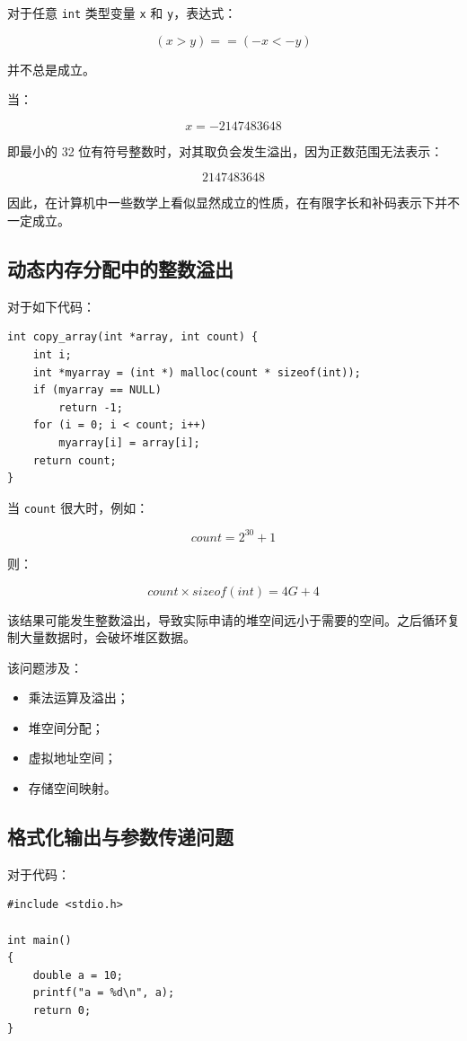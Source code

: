 \documentclass[12pt,a4paper]{ctexart}
\begin{document}
对于任意 \texttt{int} 类型变量 \texttt{x} 和 \texttt{y}，表达式：

\[
(x > y) == (-x < -y)
\]

并不总是成立。

当：

\[
x = -2147483648
\]

即最小的 32 位有符号整数时，对其取负会发生溢出，因为正数范围无法表示：

\[
2147483648
\]

因此，在计算机中一些数学上看似显然成立的性质，在有限字长和补码表示下并不一定成立。

\subsection{动态内存分配中的整数溢出}

对于如下代码：

\begin{verbatim}
int copy_array(int *array, int count) {
    int i;
    int *myarray = (int *) malloc(count * sizeof(int));
    if (myarray == NULL)
        return -1;
    for (i = 0; i < count; i++)
        myarray[i] = array[i];
    return count;
}
\end{verbatim}

当 \texttt{count} 很大时，例如：

\[
count = 2^{30} + 1
\]

则：

\[
count \times sizeof(int) = 4G + 4
\]

该结果可能发生整数溢出，导致实际申请的堆空间远小于需要的空间。之后循环复制大量数据时，会破坏堆区数据。

该问题涉及：

\begin{itemize}
    \item 乘法运算及溢出；
    \item 堆空间分配；
    \item 虚拟地址空间；
    \item 存储空间映射。
\end{itemize}

\subsection{格式化输出与参数传递问题}

对于代码：

\begin{verbatim}
#include <stdio.h>

int main()
{
    double a = 10;
    printf("a = %d\n", a);
    return 0;
}
\end{verbatim}
\end{document}
